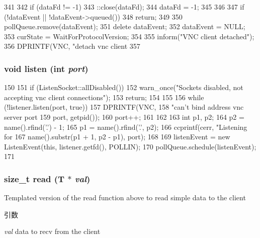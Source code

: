\begin{DoxyCode}
341 {
342     if (dataFd != -1) {
343         ::close(dataFd);
344         dataFd = -1;
345     }
346 
347     if (!dataEvent || !dataEvent->queued())
348         return;
349 
350     pollQueue.remove(dataEvent);
351     delete dataEvent;
352     dataEvent = NULL;
353     curState = WaitForProtocolVersion;
354 
355     inform("VNC client detached\n");
356     DPRINTF(VNC, "detach vnc client %
357 }
\end{DoxyCode}
\hypertarget{classVncServer_ac0c44c1417536740ffc2cf33117027cf}{
\subsubsection[{listen}]{\setlength{\rightskip}{0pt plus 5cm}void listen (int {\em port})}}
\label{classVncServer_ac0c44c1417536740ffc2cf33117027cf}



\begin{DoxyCode}
150 {
151     if (ListenSocket::allDisabled()) {
152         warn_once("Sockets disabled, not accepting vnc client connections");
153         return;
154     }
155 
156     while (!listener.listen(port, true)) {
157         DPRINTF(VNC,
158                 "can't bind address vnc server port %
159                 port, getpid());
160         port++;
161     }
162 
163     int p1, p2;
164     p2 = name().rfind('.') - 1;
165     p1 = name().rfind('.', p2);
166     ccprintf(cerr, "Listening for %
167              name().substr(p1 + 1, p2 - p1), port);
168 
169     listenEvent = new ListenEvent(this, listener.getfd(), POLLIN);
170     pollQueue.schedule(listenEvent);
171 }
\end{DoxyCode}
\hypertarget{classVncServer_a09f96768306b6f498cf39d32962a853d}{
\subsubsection[{read}]{\setlength{\rightskip}{0pt plus 5cm}size\_\-t read (T $\ast$ {\em val})}}
\label{classVncServer_a09f96768306b6f498cf39d32962a853d}
Templated version of the read function above to read simple data to the client 
\begin{DoxyParams}{引数}
\item[{\em val}]data to recv from the client \end{DoxyParams}



